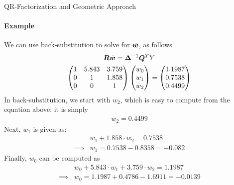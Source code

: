 \begin{frame}{QR-Factorization and Geometric Approach}
\framesubtitle{Example}
We can use back-substitution to solve for $\tilde{{\boldsymbol w}}$, as follows
\begin{gather*}
{\boldsymbol R}\tilde{{\boldsymbol w}}  = {\bm \Delta}^{-1} {\boldsymbol Q}^T Y\\
    \begin{pmatrix} 
        1 & 5.843 & 3.759\\
        0 & 1 & 1.858\\
        0 & 0 & 1
     \end{pmatrix} \begin{pmatrix} w_0\\w_1\\w_2 \end{pmatrix}  = \begin{pmatrix} 1.1987\\ 0.7538\\ 0.4499 \end{pmatrix}
\end{gather*}
In back-substitution, we start with $w_2$, which is easy to compute from
the equation above; it is simply
\begin{align*}
    w_2 = 0.4499
\end{align*}
Next, $w_1$ is given as:
\begin{align*}
    & w_1 + 1.858 \cdot w_2 = 0.7538\\
    \implies & w_1 = 0.7538 - 0.8358 = -0.082
\end{align*}
Finally, $w_0$ can be computed as
\begin{align*}
    & w_0 + 5.843 \cdot w_1 + 3.759 \cdot w_2 = 1.1987\\
    \implies & w_0 = 1.1987 + 0.4786 - 1.6911 = -0.0139
\end{align*}
\end{frame}


